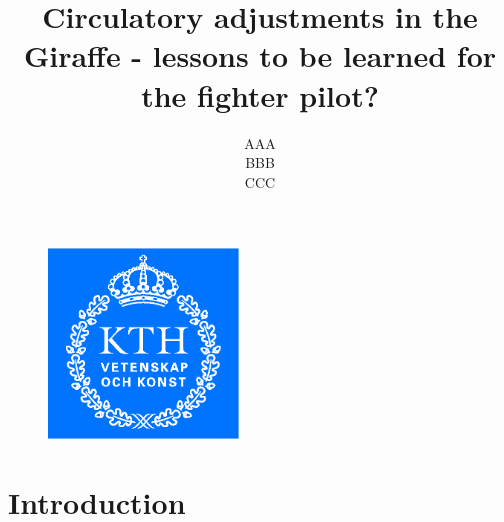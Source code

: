 \documentclass[11pt,a4paper,roman]{scrartcl}
\title{Circulatory adjustments in the Giraffe - lessons to be learned for the fighter pilot?}
\date{}
\author{AAA\\BBB\\CCC}
\begin{document}
\maketitle
\begin{figure}[h]
\centering\includegraphics[width=0.45\textwidth]{KTH_CMYK}
\end{figure}
\newpage

\section{Introduction}
\end{document}
